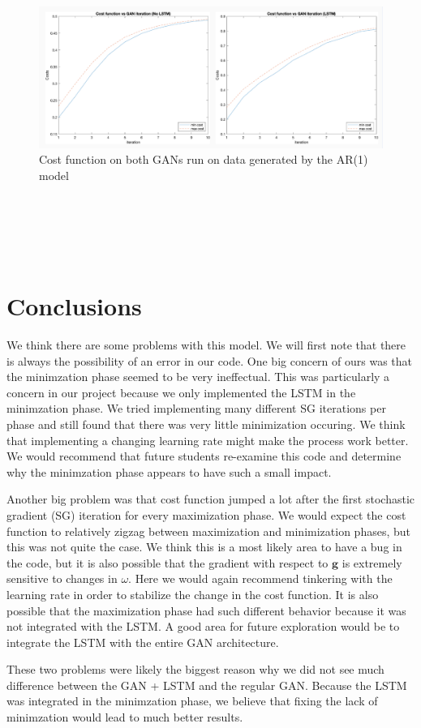 \documentclass[10pt]{article}
\begin{document}
\begin{figure}[h]
    \includegraphics[angle=0,scale=.6]{generateddata}
    \caption{Cost function on both GANs run on data generated by the AR(1) model}
\end{figure}
\ \\
\ \\
\ \\
\ \\
\section{Conclusions}
We think there are some problems with this model. We will first note that there is always the possibility of an error in our code. One big concern of ours was that the minimzation phase seemed to be very ineffectual. This was particularly a concern in our project because we only implemented the LSTM in the minimzation phase. We tried implementing many different SG iterations per phase and still found that there was very little minimization occuring. We think that implementing a changing learning rate might make the process work better. We would recommend that future students re-examine this code and determine why the minimzation phase appears to have such a small impact. 

Another big problem was that cost function jumped a lot after the first stochastic gradient (SG) iteration for every maximization phase. We would expect the cost function to relatively zigzag between maximization and minimization phases, but this was not quite the case. We think this is a most likely area to have a bug in the code, but it is also possible that the gradient with respect to \(\mathbf{g}\) is extremely sensitive to changes in \(\omega\). Here we would again recommend tinkering with the learning rate in order to stabilize the change in the cost function. It is also possible that the maximization phase had such different behavior because it was not integrated with the LSTM. A good area for future exploration would be to integrate the LSTM with the entire GAN architecture.

These two problems were likely the biggest reason why we did not see much difference between the GAN + LSTM and the regular GAN. Because the LSTM was integrated in the minimzation phase, we believe that fixing the lack of minimzation would lead to much better results.
\end{document}
